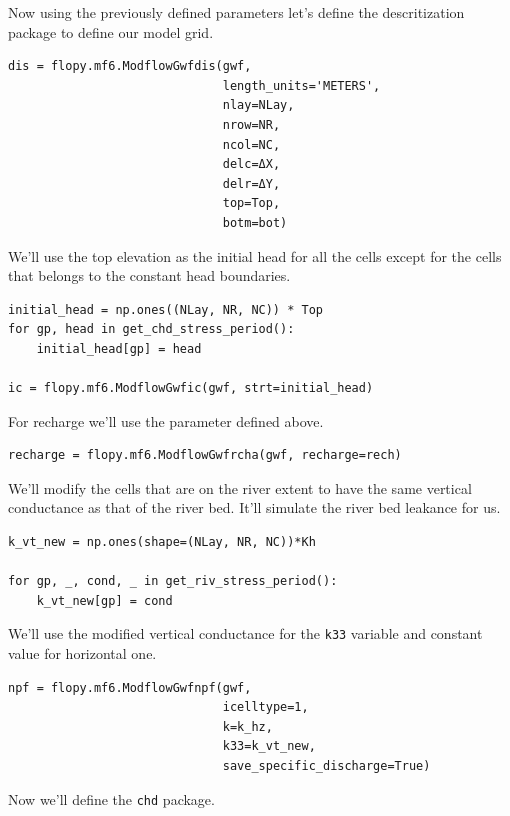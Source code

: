\documentclass[titlepage,12pt]{unisubmission}
\begin{document}
Now using the previously defined parameters let's define the descritization package to define our model grid.

\begin{verbatim}
dis = flopy.mf6.ModflowGwfdis(gwf,
                              length_units='METERS',
                              nlay=NLay,
                              nrow=NR,
                              ncol=NC,
                              delc=ΔX,
                              delr=ΔY,
                              top=Top,
                              botm=bot)
\end{verbatim}

We'll use the top elevation as the initial head for all the cells except for the cells that belongs to the constant head boundaries.

\begin{verbatim}
initial_head = np.ones((NLay, NR, NC)) * Top
for gp, head in get_chd_stress_period():
    initial_head[gp] = head

ic = flopy.mf6.ModflowGwfic(gwf, strt=initial_head)
\end{verbatim}

For recharge we'll use the parameter defined above.

\begin{verbatim}
recharge = flopy.mf6.ModflowGwfrcha(gwf, recharge=rech)
\end{verbatim}

We'll modify the cells that are on the river extent to have the same vertical conductance as that of the river bed. It'll simulate the river bed leakance for us.

\begin{verbatim}
k_vt_new = np.ones(shape=(NLay, NR, NC))*Kh

for gp, _, cond, _ in get_riv_stress_period():
    k_vt_new[gp] = cond
\end{verbatim}

We'll use the modified vertical conductance for the \texttt{k33} variable and constant value for horizontal one.

\begin{verbatim}
npf = flopy.mf6.ModflowGwfnpf(gwf,
                              icelltype=1,
                              k=k_hz,
                              k33=k_vt_new,
                              save_specific_discharge=True)
\end{verbatim}

Now we'll define the \texttt{chd} package.
\end{document}
